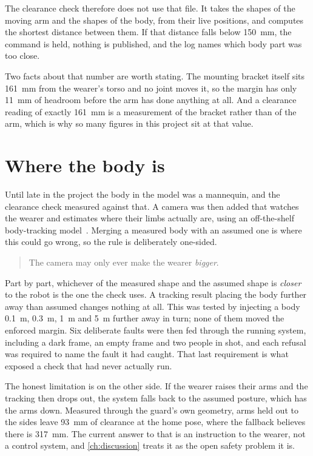 The clearance check therefore does not use that file. It takes the shapes of
the moving arm and the shapes of the body, from their live positions, and
computes the shortest distance between them. If that distance falls below
\SI{150}{\milli\metre}, the command is held, nothing is published, and the log
names which body part was too close.

Two facts about that number are worth stating. The mounting bracket itself
sits \SI{161}{\milli\metre} from the wearer's torso and no joint moves it, so
the margin has only \SI{11}{\milli\metre} of headroom before the arm has done
anything at all. And a clearance reading of exactly \SI{161}{\milli\metre} is
a measurement of the bracket rather than of the arm, which is why so many
figures in this project sit at that value.

\section{Where the body is}

Until late in the project the body in the model was a mannequin, and the
clearance check measured against that. A camera was then added that watches
the wearer and estimates where their limbs actually are, using an off-the-shelf
body-tracking model~\cite{lugaresi2019mediapipe}. Merging a measured body with
an assumed one is where this could go wrong, so the rule is deliberately
one-sided.

\begin{quote}
The camera may only ever make the wearer \emph{bigger}.
\end{quote}

Part by part, whichever of the measured shape and the assumed shape is
\emph{closer} to the robot is the one the check uses. A tracking result placing
the body further away than assumed changes nothing at all. This was tested by
injecting a body \SI{0.1}{\metre}, \SI{0.3}{\metre}, \SI{1}{\metre} and
\SI{5}{\metre} further away in turn; none of them moved the enforced margin.
Six deliberate faults were then fed through the running system, including a
dark frame, an empty frame and two people in shot, and each refusal was
required to name the fault it had caught. That last requirement is what
exposed a check that had never actually run.

The honest limitation is on the other side. If the wearer raises their arms
and the tracking then drops out, the system falls back to the assumed posture,
which has the arms down. Measured through the guard's own geometry, arms held
out to the sides leave \SI{93}{\milli\metre} of clearance at the home pose,
where the fallback believes there is \SI{317}{\milli\metre}. The current answer
to that is an instruction to the wearer, not a control system, and
\cref{ch:discussion} treats it as the open safety problem it is.

